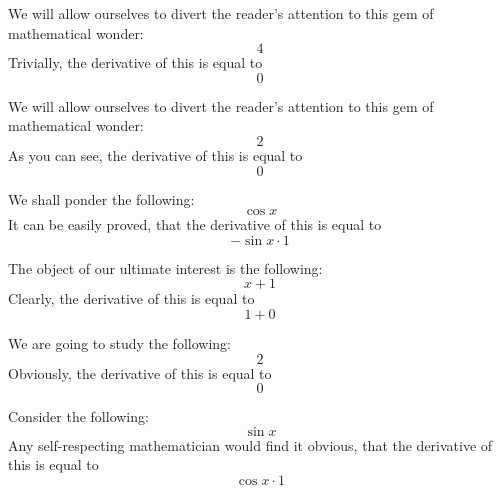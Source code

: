\documentclass{article}
\begin{document}
We will allow ourselves to divert the reader's attention to this gem of mathematical wonder:
\begin{equation}
4 
\end{equation}
Trivially, the derivative of this is equal to
\begin{equation}
0 
\end{equation}

We will allow ourselves to divert the reader's attention to this gem of mathematical wonder:
\begin{equation}
2 
\end{equation}
As you can see, the derivative of this is equal to
\begin{equation}
0 
\end{equation}

We shall ponder the following:
\begin{equation}
\cos x 
\end{equation}
It can be easily proved, that the derivative of this is equal to
\begin{equation}
-\sin x \cdot 1 
\end{equation}

The object of our ultimate interest is the following:
\begin{equation}
x + 1 
\end{equation}
Clearly, the derivative of this is equal to
\begin{equation}
1 + 0 
\end{equation}

We are going to study the following:
\begin{equation}
2 
\end{equation}
Obviously, the derivative of this is equal to
\begin{equation}
0 
\end{equation}

Consider the following:
\begin{equation}
\sin x 
\end{equation}
Any self-respecting mathematician would find it obvious, that the derivative of this is equal to
\begin{equation}
\cos x \cdot 1 
\end{equation}
\end{document}
